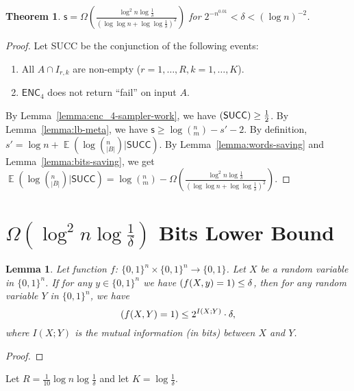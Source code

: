 \documentclass[10pt]{article}
\DeclareMathOperator*{\E}{\mathbb{E}}
\let\Pr\relax
\DeclareMathOperator*{\Pr}{\mathbb{P}}
\newtheorem{theorem}{Theorem}
\newtheorem{lemma}{Lemma}
\newcommand{\success}{\textsf{SUCC}\xspace}
\newcommand{\enc}{\textsf{ENC}\xspace}
\newcommand{\s}{\textsf{s}\xspace}
\begin{document}
\begin{theorem}
  $\s = \Omega(\frac{\log^2 n\log{\frac{1}{\delta}}}{(\log\log n+\log\log \frac{1}{\delta})^2})$ for $2^{-n^{0.01}}<\delta<(\log n)^{-2}$.
\end{theorem}

\begin{proof}
  Let \success be the conjunction of the following events:
  \begin{enumerate}
    \item All $A \cap I_{r,k}$ are non-empty ($r=1,\ldots, R, k=1,\ldots, K$).
    \item $\enc_4$ does not return ``fail'' on input $A$.
  \end{enumerate}
  By Lemma~\ref{lemma:enc_4-sampler-work}, we have $\Pr(\success)\ge \frac{1}{2}$. By Lemma~\ref{lemma:lb-meta}, we have $\s\ge \log (^n_m) - s' -2$. By definition, $s'=\log n + \E(\log (^n_{|B|})|\success)$. By Lemma~\ref{lemma:words-saving} and Lemma~\ref{lemma:bits-saving}, we get $\E(\log (^n_{|B|})|\success)=\log (^n_m)-\Omega(\frac{\log^2 n\log{\frac{1}{\delta}}}{(\log\log n+\log\log \frac{1}{\delta})^2})$. 
\end{proof}

\section{$\Omega(\log^2 n \log \frac{1}{\delta})$ Bits Lower Bound}

\begin{lemma}
  Let function $f$: $\{0,1\}^n\times \{0,1\}^n\rightarrow \{0,1\}$. Let $X$ be a random variable in $\{0,1\}^n$. If for any $y\in \{0,1\}^n$ we have $\Pr(f(X,y)=1)\le \delta$, then for any random variable $Y$ in $\{0,1\}^n$, we have 
  $$\Pr(f(X,Y)=1)\le 2^{I(X;Y)}\cdot \delta,$$ 
  where $I(X;Y)$ is the mutual information (in bits) between $X$ and $Y$.
\end{lemma}

\begin{proof}
  
\end{proof}

Let $R=\frac{1}{10}\log n \log \frac{1}{\delta}$ and let $K=\log \frac{1}{\delta}$. 
\end{document}
